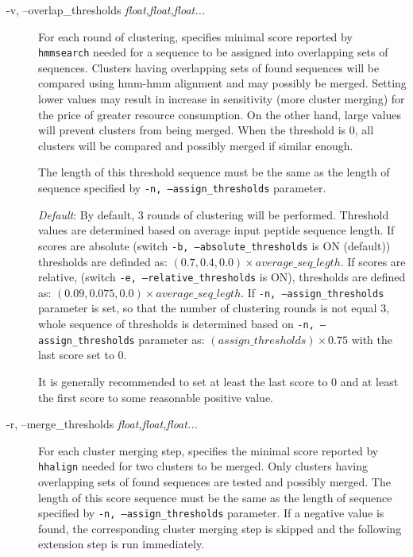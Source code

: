 \documentclass[11pt, a4paper, twoside, titlepage]{article}
\begin{document}
\begin{description}
\begin{sloppypar}
\end{sloppypar}	  
	    
	\item[-v, --overlap\_thresholds \rm \textlangle \textit{float,float,float...}\textrangle] For each round of clustering, specifies minimal score reported by \texttt{hmmsearch} needed for a sequence to be assigned into overlapping sets of sequences. Clusters having overlapping sets of found sequences will be compared using hmm-hmm alignment and may possibly be merged. Setting lower values may result in increase in sensitivity (more cluster merging) for the price of greater resource consumption. On the other hand, large values will prevent clusters from being merged. When the threshold is 0, all clusters will be compared and possibly merged if similar enough. 
	
	The length of this threshold sequence must be the same as the length of sequence specified by \texttt{-n, --assign\_thresholds} parameter.

\begin{sloppypar}	 
	 
	  \textit{Default}: By default, 3 rounds of clustering will be performed. Threshold values are determined based on average input peptide sequence length. If scores are absolute (switch \texttt{-b, --absolute\_thresholds} is ON (default)) thresholds are definded as: $(0.7, 0.4, 0.0)\times average\_seq\_legth$. If scores are relative, (switch \texttt{-e, --relative\_thresholds} is ON),  thresholds are defined as: $(0.09, 0.075, 0.0)\times average\_seq\_legth$.
	   If  \texttt{-n, --assign\_thresholds} parameter is set, so that the number of clustering rounds is not equal 3, whole sequence of thresholds is determined based on \texttt{-n, --assign\_thresholds} parameter as: $(assign\_thresholds)\times 0.75$ with the last score set to 0.
	  
	  It is generally recommended to set at least the last score to 0 and at least the first score to some reasonable positive value.
	  
\end{sloppypar}
	
	  \item[-r, --merge\_thresholds \rm \textlangle \textit{float,float,float...}\textrangle] For each cluster merging step, specifies the minimal score reported by \texttt{hhalign} needed for two clusters to be merged. Only clusters having overlapping sets of found sequences are tested and possibly merged. The length of this score sequence must be the same as the length of sequence specified by \texttt{-n, --assign\_thresholds} parameter. If a negative value is found, the corresponding cluster merging step is skipped and the following extension step is run immediately.
	  

\end{description}
\end{document}
